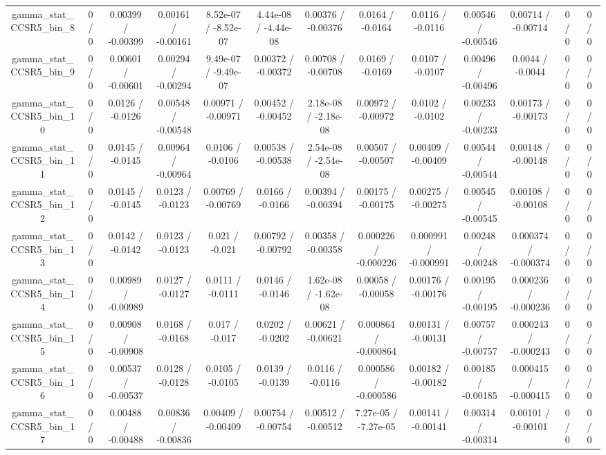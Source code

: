 \documentclass[10pt]{article}
\begin{document}
\begin{table}[htbp]
\begin{center}
\begin{tabular}{|c|c|c|c|c|c|c|c|c|c|c|c|c|}
  gamma_stat_CCSR5_bin_8 & 0 / 0 & 0.00399 / -0.00399 & 0.00161 / -0.00161 & 8.52e-07 / -8.52e-07 & 4.44e-08 / -4.44e-08 & 0.00376 / -0.00376 & 0.0164 / -0.0164 & 0.0116 / -0.0116 & 0.00546 / -0.00546 & 0.00714 / -0.00714 & 0 / 0 & 0 / 0 \\ 
  gamma_stat_CCSR5_bin_9 & 0 / 0 & 0.00601 / -0.00601 & 0.00294 / -0.00294 & 9.49e-07 / -9.49e-07 & 0.00372 / -0.00372 & 0.00708 / -0.00708 & 0.0169 / -0.0169 & 0.0107 / -0.0107 & 0.00496 / -0.00496 & 0.0044 / -0.0044 & 0 / 0 & 0 / 0 \\ 
  gamma_stat_CCSR5_bin_10 & 0 / 0 & 0.0126 / -0.0126 & 0.00548 / -0.00548 & 0.00971 / -0.00971 & 0.00452 / -0.00452 & 2.18e-08 / -2.18e-08 & 0.00972 / -0.00972 & 0.0102 / -0.0102 & 0.00233 / -0.00233 & 0.00173 / -0.00173 & 0 / 0 & 0 / 0 \\ 
  gamma_stat_CCSR5_bin_11 & 0 / 0 & 0.0145 / -0.0145 & 0.00964 / -0.00964 & 0.0106 / -0.0106 & 0.00538 / -0.00538 & 2.54e-08 / -2.54e-08 & 0.00507 / -0.00507 & 0.00409 / -0.00409 & 0.00544 / -0.00544 & 0.00148 / -0.00148 & 0 / 0 & 0 / 0 \\ 
  gamma_stat_CCSR5_bin_12 & 0 / 0 & 0.0145 / -0.0145 & 0.0123 / -0.0123 & 0.00769 / -0.00769 & 0.0166 / -0.0166 & 0.00394 / -0.00394 & 0.00175 / -0.00175 & 0.00275 / -0.00275 & 0.00545 / -0.00545 & 0.00108 / -0.00108 & 0 / 0 & 0 / 0 \\ 
  gamma_stat_CCSR5_bin_13 & 0 / 0 & 0.0142 / -0.0142 & 0.0123 / -0.0123 & 0.021 / -0.021 & 0.00792 / -0.00792 & 0.00358 / -0.00358 & 0.000226 / -0.000226 & 0.000991 / -0.000991 & 0.00248 / -0.00248 & 0.000374 / -0.000374 & 0 / 0 & 0 / 0 \\ 
  gamma_stat_CCSR5_bin_14 & 0 / 0 & 0.00989 / -0.00989 & 0.0127 / -0.0127 & 0.0111 / -0.0111 & 0.0146 / -0.0146 & 1.62e-08 / -1.62e-08 & 0.00058 / -0.00058 & 0.00176 / -0.00176 & 0.00195 / -0.00195 & 0.000236 / -0.000236 & 0 / 0 & 0 / 0 \\ 
  gamma_stat_CCSR5_bin_15 & 0 / 0 & 0.00908 / -0.00908 & 0.0168 / -0.0168 & 0.017 / -0.017 & 0.0202 / -0.0202 & 0.00621 / -0.00621 & 0.000864 / -0.000864 & 0.00131 / -0.00131 & 0.00757 / -0.00757 & 0.000243 / -0.000243 & 0 / 0 & 0 / 0 \\ 
  gamma_stat_CCSR5_bin_16 & 0 / 0 & 0.00537 / -0.00537 & 0.0128 / -0.0128 & 0.0105 / -0.0105 & 0.0139 / -0.0139 & 0.0116 / -0.0116 & 0.000586 / -0.000586 & 0.00182 / -0.00182 & 0.00185 / -0.00185 & 0.000415 / -0.000415 & 0 / 0 & 0 / 0 \\ 
  gamma_stat_CCSR5_bin_17 & 0 / 0 & 0.00488 / -0.00488 & 0.00836 / -0.00836 & 0.00409 / -0.00409 & 0.00754 / -0.00754 & 0.00512 / -0.00512 & 7.27e-05 / -7.27e-05 & 0.00141 / -0.00141 & 0.00314 / -0.00314 & 0.00101 / -0.00101 & 0 / 0 & 0 / 0 \\ 

\end{tabular}
\end{center}
\end{table}
\end{document}
